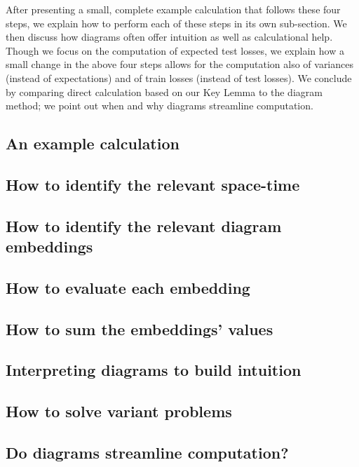 \documentclass{article}
\theoremstyle{plain}
\theoremstyle{definition}
\begin{document}
    After presenting a small, complete example calculation that follows these
    four steps, we explain how to perform each of these steps in its own
    sub-section.  We then discuss how diagrams often offer intuition as well as
    calculational help.  Though we focus on the computation of expected test
    losses, we explain how a small change in the above four steps allows for
    the computation also of variances (instead of expectations) and of train
    losses (instead of test losses).  We conclude by comparing direct
    calculation based on our Key Lemma to the diagram method; we point out when
    and why diagrams streamline computation.

    \subsection{An example calculation}                             \label{appendix:example}
    \subsection{How to identify the relevant space-time}            \label{appendix:draw-spacetime}
    \subsection{How to identify the relevant diagram embeddings}    \label{appendix:draw-embeddings}
    \subsection{How to evaluate each embedding}                     \label{appendix:evaluate-embeddings}
    \subsection{How to sum the embeddings' values}                  \label{appendix:sum-embeddings}
    \subsection{Interpreting diagrams to build intuition}           \label{appendix:interpret-diagrams}
    \subsection{How to solve variant problems}                      \label{appendix:solve-variants}
    \subsection{Do diagrams streamline computation?}                \label{appendix:diagrams-streamline}
\end{document}

